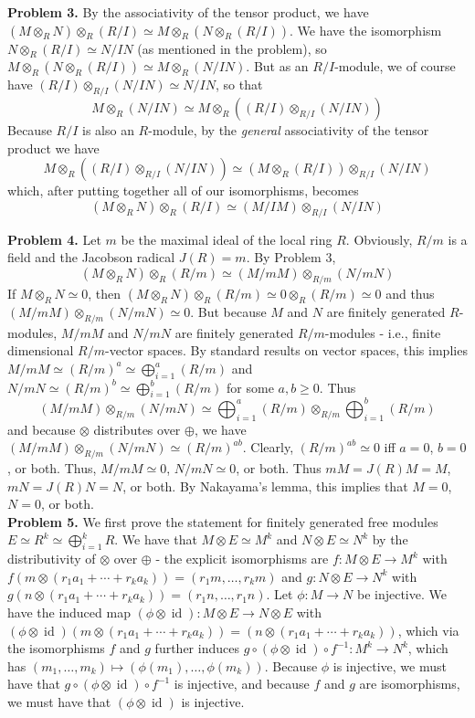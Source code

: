 \documentclass[11pt]{article}
\newcommand{\num}[1]{\noindent \textbf{#1}}
\newcommand{\id}{\operatorname{id}}
\theoremstyle{definition}
\begin{document}
\num{Problem 3.} By the associativity of the tensor product, we have $(M\otimes_R N)\otimes_R(R/I)\simeq M\otimes_R(N\otimes_R (R/I))$. We have the isomorphism $N\otimes_R(R/I)\simeq N/IN$ (as mentioned in the problem), so $M\otimes_R(N\otimes_R (R/I))\simeq M\otimes_R(N/IN)$. But as an $R/I$-module, we of course have $(R/I)\otimes_{R/I}(N/IN)\simeq N/IN$, so that 
\[M\otimes_R(N/IN)\simeq M\otimes_R((R/I)\otimes_{R/I}(N/IN))\] 
Because $R/I$ is also an $R$-module, by the \textit{general} associativity of the tensor product we have
\[M\otimes_R((R/I)\otimes_{R/I}(N/IN))\simeq (M\otimes_R (R/I))\otimes_{R/I}(N/IN)\]
which, after putting together all of our isomorphisms, becomes
\[(M\otimes_R N)\otimes_R(R/I)\simeq (M/IM)\otimes_{R/I}(N/IN)\]

\num{Problem 4.} Let $m$ be the maximal ideal of the local ring $R$. Obviously, $R/m$ is a field and the Jacobson radical $J(R)=m$. By Problem 3, 
\[(M\otimes_RN)\otimes_R(R/m)\simeq (M/mM)\otimes_{R/m}(N/mN)\]
If $M\otimes_RN\simeq0$, then $(M\otimes_RN)\otimes_R(R/m)\simeq0\otimes_R(R/m)\simeq 0$ and thus $(M/mM)\otimes_{R/m}(N/mN)\simeq0$. But because $M$ and $N$ are finitely generated $R$-modules, $M/mM$ and $N/mN$ are finitely generated $R/m$-modules - i.e., finite dimensional $R/m$-vector spaces. By standard results on vector spaces, this implies $M/mM\simeq (R/m)^a\simeq\bigoplus_{i=1}^a(R/m)$ and $N/mN\simeq (R/m)^b\simeq\bigoplus_{i=1}^b(R/m)$ for some $a,b\geq0$. Thus 
\[(M/mM)\otimes_{R/m}(N/mN)\simeq \bigoplus_{i=1}^a(R/m)\otimes_{R/m}\bigoplus_{i=1}^b(R/m)\]
and because $\otimes$ distributes over $\oplus$, we have $(M/mM)\otimes_{R/m}(N/mN)\simeq (R/m)^{ab}$. Clearly, $(R/m)^{ab}\simeq0$ iff $a=0$, $b=0$, or both. Thus, $M/mM\simeq0$, $N/mN\simeq0$, or both. Thus $mM=J(R)M=M$, $mN=J(R)N=N$, or both. By Nakayama's lemma, this implies that $M=0$, $N=0$, or both.   \\

\num{Problem 5.} We first prove the statement for finitely generated free modules $E\simeq R^k\simeq\bigoplus_{i=1}^k R$. We have that $M\otimes E\simeq M^k$ and $N\otimes E\simeq N^k$ by the distributivity of $\otimes$ over $\oplus$ - the explicit isomorphisms are $f:M\otimes E\rightarrow M^k$ with $f(m\otimes(r_1a_1+\cdots+r_ka_k))=(r_1m,\ldots,r_km)$ and $g:N\otimes E\rightarrow N^k$ with $g(n\otimes(r_1a_1+\cdots+r_ka_k))=(r_1n,\ldots,r_1n)$. Let $\phi:M\rightarrow N$ be injective. We have the induced map $(\phi\otimes\id):M\otimes E\rightarrow N\otimes E$ with $(\phi\otimes\id)(m\otimes(r_1a_1+\cdots+r_ka_k))=(n\otimes(r_1a_1+\cdots+r_ka_k))$, which via the isomorphisms $f$ and $g$ further induces $g\circ(\phi\otimes\id)\circ f^{-1}:M^k\rightarrow N^k$, which has $(m_1,\ldots,m_k)\mapsto(\phi(m_1),\ldots,\phi(m_k))$. Because $\phi$ is injective, we must have that $g\circ(\phi\otimes\id)\circ f^{-1}$ is injective, and because $f$ and $g$ are isomorphisms, we must have that $(\phi\otimes\id)$ is injective.\\
\end{document}
